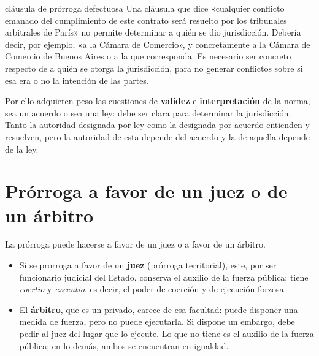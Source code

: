 \documentclass[12pt,oneside]{book}
\begin{document}
\begin{example}{cláusula de prórroga defectuosa}
Una cláusula que dice «cualquier conflicto emanado del cumplimiento de este contrato será resuelto por los tribunales arbitrales de París» no permite determinar a quién se dio jurisdicción. Debería decir, por ejemplo, «a la Cámara de Comercio», y concretamente a la Cámara de Comercio de Buenos Aires o a la que corresponda. Es necesario ser concreto respecto de a quién se otorga la jurisdicción, para no generar conflictos sobre si esa era o no la intención de las partes.
\end{example}

Por ello adquieren peso las cuestiones de \textbf{validez} e \textbf{interpretación} de la norma, sea un acuerdo o sea una ley: debe ser clara para determinar la jurisdicción. Tanto la autoridad designada por ley como la designada por acuerdo entienden y resuelven, pero la autoridad de esta depende del acuerdo y la de aquella depende de la ley.

\section{Prórroga a favor de un juez o de un árbitro}

La prórroga puede hacerse a favor de un juez o a favor de un árbitro.

\begin{itemize}
    \item Si se prorroga a favor de un \textbf{juez} (prórroga territorial), este, por ser funcionario judicial del Estado, conserva el auxilio de la fuerza pública: tiene \textit{coertio} y \textit{executio}, es decir, el poder de coerción y de ejecución forzosa.
    \item El \textbf{árbitro}, que es un privado, carece de esa facultad: puede disponer una medida de fuerza, pero no puede ejecutarla. Si dispone un embargo, debe pedir al juez del lugar que lo ejecute. Lo que no tiene es el auxilio de la fuerza pública; en lo demás, ambos se encuentran en igualdad.
\end{itemize}
\end{document}
